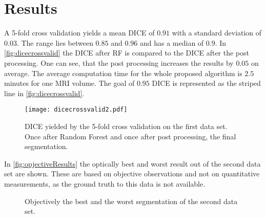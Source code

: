 \section{Results}
A 5-fold cross validation yields a mean DICE of $0.91$ with a standard deviation of $0.03$. The range lies between $0.85$ and $0.96$ and has a median of $0.9$. In \autoref{fig:dicecrossvalid} the DICE after RF is compared to the DICE after the post processing. One can see, that the post processing increases the results by $0.05$ on average. The average computation time for the whole proposed algorithm is $2.5$ minutes for one MRI volume. The goal of $0.95$ DICE is represented as the striped line in \autoref{fig:dicecrossvalid}.
\begin{figure}[h]
\centering
\texttt{[image: dicecrossvalid2.pdf]}
\caption{DICE yielded by the 5-fold cross validation on the first data set. Once after Random Forest and once after post processing, the final segmentation.}
\label{fig:dicecrossvalid}
\end{figure}

In \autoref{fig:opjectiveResults} the optically best and worst result out of the second data set are shown. These are based on objective observations and not on quantitative measurements, as the ground truth to this data is not available.
\begin{figure*}[!t]
	\centering
	\hfil
	
	\caption{Objectively the best and the worst segmentation of the second data set.}
	\label{fig:opjectiveResults}
\end{figure*}
